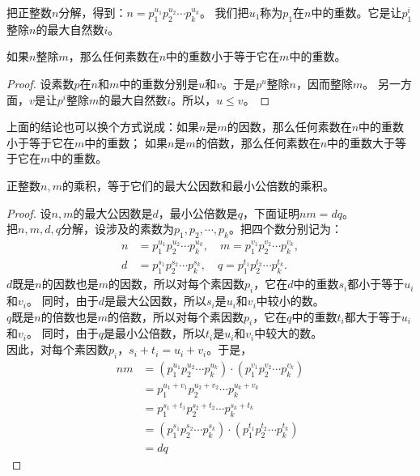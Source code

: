 \documentclass[12pt,UTF8,fontset=none]{ctexbook}
\begin{document}
把正整数$n$分解，得到：$n = p_1^{u_1} p_2^{u_2} \cdots p_k^{u_k}$。
我们把$u_1$称为$p_1$在$n$中的重数。它是让$p_1^i$整除$n$的最大自然数$i$。
\begin{tm}\label{tm:1-1-10}
    如果$n$整除$m$，那么任何素数在$n$中的重数小于等于它在$m$中的重数。
\end{tm}
\begin{proof}
    设素数$p$在$n$和$m$中的重数分别是$u$和$v$。于是$p^u$整除$n$，因而整除$m$。
    另一方面，$v$是让$p^i$整除$m$的最大自然数$i$。所以，$u \leqslant v$。
\end{proof}

上面的结论也可以换个方式说成：如果$n$是$m$的因数，那么任何素数在$n$中的重数小于等于它在$m$中的重数；
如果$n$是$m$的倍数，那么任何素数在$n$中的重数大于等于它在$m$中的重数。

\begin{tm}\label{tm:1-1-20}
    正整数$n,m$的乘积，等于它们的最大公因数和最小公倍数的乘积。
\end{tm}
\begin{proof}
    设$n,m$的最大公因数是$d$，最小公倍数是$q$，下面证明$nm = dq$。\\
    把$n,m,d,q$分解，设涉及的素数为$p_1, p_2, \cdots , p_k$。把四个数分别记为：
    \begin{align*}
        n &= p_1^{u_1}p_2^{u_2}\cdots p_k^{u_k}, \quad m = p_1^{v_1}p_2^{v_2}\cdots p_k^{v_k},  \\
        d &= p_1^{s_1}p_2^{s_2}\cdots p_k^{s_k}, \quad q = p_1^{t_1}p_2^{t_2}\cdots p_k^{t_k}.  
    \end{align*}
    $d$既是$n$的因数也是$m$的因数，所以对每个素因数$p_i$，它在$d$中的重数$s_i$都小于等于$u_i$和$v_i$。
    同时，由于$d$是最大公因数，所以$s_i$是$u_i$和$v_i$中较小的数。\\
    $q$既是$n$的倍数也是$m$的倍数，所以对每个素因数$p_i$，它在$q$中的重数$t_i$都大于等于$u_i$和$v_i$。
    同时，由于$q$是最小公倍数，所以$t_i$是$u_i$和$v_i$中较大的数。\\
    因此，对每个素因数$p_i$，$s_i + t_i = u_i + v_i$。于是，
    \begin{align*}
        nm &= \left(p_1^{u_1}p_2^{u_2}\cdots p_k^{u_k}\right) \cdot \left(p_1^{v_1}p_2^{v_2}\cdots p_k^{v_k}\right)  \\
        &= p_1^{u_1 + v_1}p_2^{u_2 + v_2}\cdots p_k^{u_k + v_k}  \\
        &= p_1^{s_1 + t_1}p_2^{s_2 + t_2}\cdots p_k^{s_k + t_k}  \\
        &= \left(p_1^{s_1}p_2^{s_2}\cdots p_k^{s_k}\right) \cdot \left(p_1^{t_1}p_2^{t_2}\cdots p_k^{t_k}\right)  \\
        &= dq 
    \end{align*}    

\end{proof}
\end{document}
